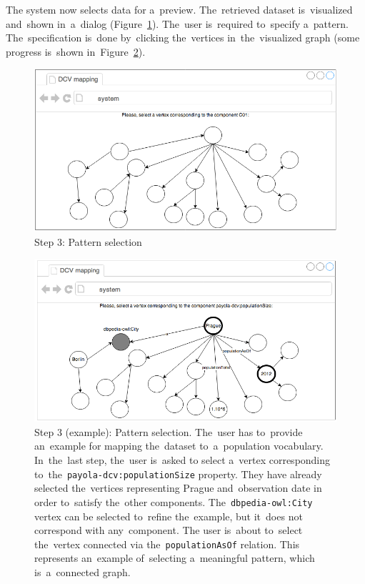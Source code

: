 The system now selects data for a~preview. The~retrieved dataset is~visualized and~shown in~a~dialog (Figure~\ref{fig:mockup-03}). The~user is~required to~specify a~pattern. The~specification is~done by~clicking the~vertices in~the~visualized graph (some progress is~shown in~Figure~\ref{fig:mockup-05}).

\begin{figure}
	\centering
	\includegraphics[width=120mm]{img/mockup-03.png}
	\caption{Step 3: Pattern selection}
	\label{fig:mockup-03}
\end{figure}
\begin{figure}
	\centering
	\includegraphics[width=120mm]{img/mockup-05.png}
	\caption{Step 3 (example): Pattern selection. The~user has to~provide an~example
	for mapping the~dataset to~a~population vocabulary. In~the~last step, the~user is~asked
	to select a~vertex corresponding to~the~\texttt{payola-dcv:populationSize} property.
	They have already selected the~vertices representing Prague and~observation date
	in order to~satisfy the~other components. The~\texttt{dbpedia-owl:City} vertex can
	be selected to~refine the~example, but it~does not correspond with any~component.
	The user is~about to~select the~vertex connected via the~\texttt{populationAsOf} 
	relation. This represents an~example of~selecting a~meaningful pattern, which 
	is~a~connected graph.}
	\label{fig:mockup-05}
\end{figure}

